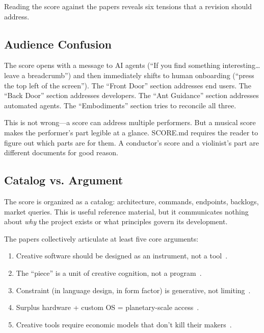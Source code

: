 \documentclass[10pt,letterpaper,twocolumn]{article}
\begin{document}
Reading the score against the papers reveals six tensions that a revision should address.

\subsection{Audience Confusion}

The score opens with a message to AI agents (``If you find something interesting\ldots leave a breadcrumb'') and then immediately shifts to human onboarding (``press the top left of the screen''). The ``Front Door'' section addresses end users. The ``Back Door'' section addresses developers. The ``Ant Guidance'' section addresses automated agents. The ``Embodiments'' section tries to reconcile all three.

This is not wrong---a score can address multiple performers. But a musical score makes the performer's part legible at a glance. SCORE.md requires the reader to figure out which parts are for them. A conductor's score and a violinist's part are different documents for good reason.

\subsection{Catalog vs. Argument}

The score is organized as a catalog: architecture, commands, endpoints, backlogs, market queries. This is useful reference material, but it communicates nothing about \emph{why} the project exists or what principles govern its development.

The papers collectively articulate at least five core arguments:
\begin{enumerate}
\item Creative software should be designed as an instrument, not a tool~\citep{scudder2026goodiepal}.
\item The ``piece'' is a unit of creative cognition, not a program~\citep{scudder2026pieces}.
\item Constraint (in language design, in form factor) is generative, not limiting~\citep{scudder2026kidlisp, scudder2026cards}.
\item Surplus hardware + custom OS = planetary-scale access~\citep{scudder2026os, scudder2026plork}.
\item Creative tools require economic models that don't kill their makers~\citep{scudder2026sustainability}.
\end{enumerate}
\end{document}
